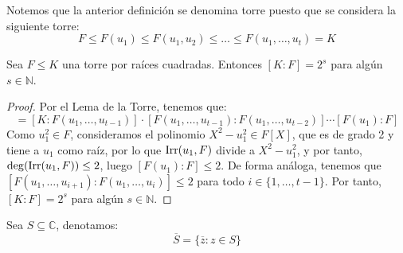 Notemos que la anterior definición se denomina torre puesto que se considera la siguiente torre:
\begin{equation*}
    F \leq F(u_1) \leq F(u_1,u_2) \leq \ldots \leq F(u_1,\ldots,u_t) = K
\end{equation*}

\begin{lema}\label{lema:grado_torres_raices}
    Sea $F\leq K$ una torre por raíces cuadradas. Entonces $[K:F] = 2^s$ para algún $s\in \mathbb{N}$.
    \begin{proof}
        Por el Lema de la Torre, tenemos que:
        \begin{equation*}
            [K:F] = [K:F(u_1,\ldots,u_{t-1})]\cdot [F(u_1,\ldots,u_{t-1}):F(u_1,\ldots,u_{t-2})]\cdots [F(u_1):F]
        \end{equation*}
        Como $u_1^2\in F$, consideramos el polinomio $X^2-u_1^2\in F[X]$, que es de grado 2 y tiene a $u_1$ como raíz, por lo que $\operatorname{Irr}(u_1,F)$ divide a $X^2-u_1^2$, y por tanto, $\deg(\operatorname{Irr}(u_1,F))\leq 2$, luego $[F(u_1):F]\leq 2$. De forma análoga, tenemos que $[F(u_1,\ldots,u_{i+1}):F(u_1,\ldots,u_i)]\leq 2$ para todo $i\in \{1,\ldots,t-1\}$. Por tanto, $[K:F] = 2^s$ para algún $s\in \mathbb{N}$.
    \end{proof}
\end{lema}

\begin{notacion}
    Sea $S\subseteq \mathbb{C}$, denotamos:
    \begin{equation*}
        \overline{S} = \{\overline{z}:z\in S\}
    \end{equation*}
\end{notacion}

